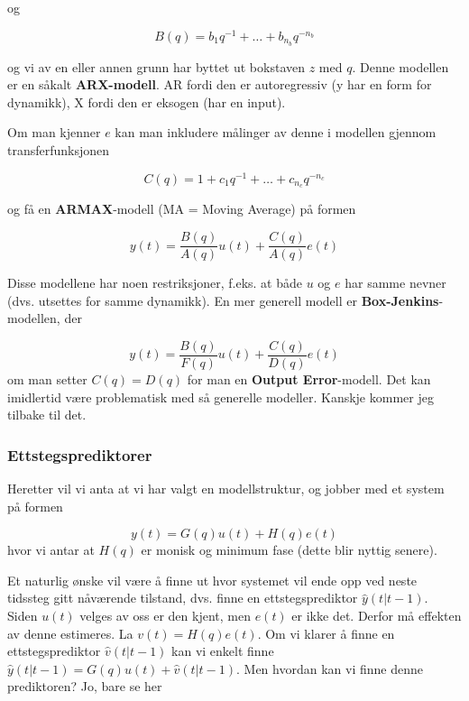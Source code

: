 og

\begin{equation}
	B(q)=b_{1} q^{-1}+\ldots+b_{n_{b}} q^{-n_{b}}
\end{equation}

og vi av en eller annen grunn har byttet ut bokstaven $z$ med $q$. Denne modellen er en såkalt \textbf{ARX-modell}. AR fordi den er autoregressiv (y har en form for dynamikk), X fordi den er eksogen (har en input).

Om man kjenner $e$ kan man inkludere målinger av denne i modellen gjennom transferfunksjonen

\begin{equation}
	C(q)=1+c_{1} q^{-1}+\ldots+c_{n_{c}} q^{-n_{c}}
\end{equation}

og få en \textbf{ARMAX}-modell (MA = Moving Average) på formen

\begin{equation}
	y(t) = \frac{B(q)}{A(q)} u(t) + \frac{C(q)}{A(q)}e(t)
\end{equation}

Disse modellene har noen restriksjoner, f.eks. at både $u$ og $e$ har samme nevner (dvs. utsettes for samme dynamikk). En mer generell modell er \textbf{Box-Jenkins}-modellen, der

\begin{equation}
	y(t)=\frac{B(q)}{F(q)} u(t)+\frac{C(q)}{D(q)} e(t)
\end{equation}
om man setter $C(q) = D(q)$ for man en \textbf{Output Error}-modell. Det kan imidlertid være problematisk med så generelle modeller. Kanskje kommer jeg tilbake til det.

\subsubsection{Ettstegsprediktorer}
Heretter vil vi anta at vi har valgt en modellstruktur, og jobber med et system på formen

\begin{equation}
	y(t) = G(q) u(t) + H(q) e(t)
\end{equation}
hvor vi antar at $H(q)$ er monisk og minimum fase (dette blir nyttig senere).

Et naturlig ønske vil være å finne ut hvor systemet vil ende opp ved neste tidssteg gitt nåværende tilstand, dvs. finne en ettstegsprediktor $\hat{y}(t | t-1)$. Siden $u(t)$ velges av oss er den kjent, men $e(t)$ er ikke det. Derfor må effekten av denne estimeres. La $v(t) = H(q) e(t)$. Om vi klarer å finne en ettstegsprediktor $\hat{v}(t | t-1)$ kan vi enkelt finne $\hat{y}(t | t-1) = G(q) u(t) + \hat{v}(t | t-1)$. Men hvordan kan vi finne denne prediktoren? Jo, bare se her

